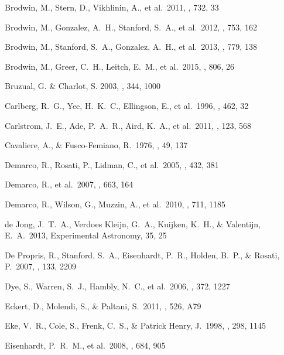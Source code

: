 \documentclass[apj,twocolumn]{emulateapj}
\begin{document}
{\begin{thebibliography}{88}
 Brodwin, M., Stern, D., Vikhlinin, A., et al.\ 2011, \apj, 732, 33 

 Brodwin, M., Gonzalez, A.~H., Stanford, S.~A., et al.\ 2012, \apj, 753, 162 

 Brodwin, M., Stanford, S.~A., Gonzalez, A.~H., et al.\ 2013, \apj, 779, 138 

 Brodwin, M., Greer, C.~H., Leitch, E.~M., et al.\ 2015, \apj, 806, 26 

 {Bruzual}, G. \& {Charlot}, S. 2003, \mnras, 344, 1000

 Carlberg, R.~G., Yee, H.~K.~C., Ellingson, E., et al.\ 1996, \apj, 462, 32 

 Carlstrom, J.~E., Ade, P.~A.~R., Aird, K.~A., et al.\ 2011, \pasp, 123, 568 

 Cavaliere, A., \& Fusco-Femiano, R.\ 1976, \aap, 49, 137 

 Demarco, R., Rosati, P., Lidman, C., et al.\ 2005, \aap, 432, 381 

 Demarco, R., et al.\ 2007, \apj, 663, 164 

 Demarco, R., Wilson, G., Muzzin, A., et al.\ 2010, \apj, 711, 1185 

 de Jong, J.~T.~A., Verdoes Kleijn, G.~A., Kuijken, K.~H., \& Valentijn, E.~A.\ 2013, Experimental Astronomy, 35, 25 

 De Propris, R., Stanford, S.~A., Eisenhardt, P.~R., Holden, B.~P., \& Rosati, P.\ 2007, \aj, 133, 2209 

 Dye, S., Warren, S.~J., Hambly, N.~C., et al.\ 2006, \mnras, 372, 1227 

 Eckert, D., Molendi, S., \& Paltani, S.\ 2011, \aap, 526, A79 

 Eke, V.~R., Cole, S., Frenk, C.~S., \& Patrick Henry, J.\ 1998, \mnras, 298, 1145 

 Eisenhardt, P.~R.~M., et al.\ 2008, \apj, 684, 905 


\end{thebibliography}}
\end{document}
